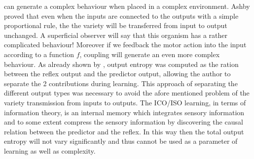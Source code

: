 can generate a complex behaviour when placed in a complex environment.
Ashby proved that even when the inputs are connected to the outputs
with a simple proportional rule, the the variety will be transferred
from input to output unchanged. A superficial observer will say that this organism has 
a rather complicated behaviour! Moreover
 if we feedback the motor action into the input according to a function $f$,
coupling will generate an even more complex behaviour.  As already shown
by \citet{Kulvicius2009:analysisdifferential}, output entropy
was computed as the ration between the reflex output and the 
predictor output, allowing the author to separate the 2 contributions during learning.
This approach of separating the different output types was necessary to
avoid the afore mentioned problem of the variety transmission from inputs to outputs.
The ICO/ISO learning, in terms of information theory, is an internal
memory which integrates sensory information and to some extent compress the
sensory information by discovering the causal relation between the predictor and the reflex.
In this way then the total output entropy will not vary significantly and thus
cannot be used as a parameter of learning as well as complexity.



